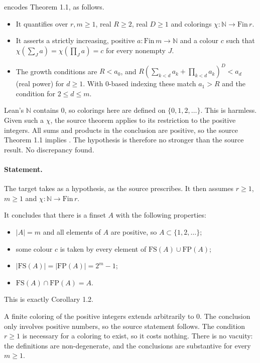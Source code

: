 \documentclass[11pt]{article}
\theoremstyle{definition}
\theoremstyle{remark}
\newcommand{\leanname}[1]{\texttt{\detokenize{#1}}}
\begin{document}
\leanname{HindmanFSFP.Thm11} encodes Theorem 1.1, as follows.
\begin{itemize}
\item It quantifies over $r,m\ge1$, real $R\ge2$, real $D\ge1$ and colorings $\chi:\mathbb N\to\mathrm{Fin}\,r$.
\item It asserts a strictly increasing, positive $a:\mathrm{Fin}\,m\to\mathbb N$ and a colour $c$ such that $\chi(\sum_J a)=\chi(\prod_J a)=c$ for every nonempty $J$.
\item The growth conditions are $R<a_0$, and $R(\sum_{k<d}a_k+\prod_{k<d}a_k)^D<a_d$ (real power) for $d\ge1$. With 0-based indexing these match $a_1>R$ and the condition for $2\le d\le m$.
\end{itemize}

Lean's $\mathbb N$ contains $0$, so colorings here are defined on $\{0,1,2,\ldots\}$. This is harmless. Given such a $\chi$, the source theorem applies to its restriction to the positive integers. All sums and products in the conclusion are positive, so the source Theorem 1.1 implies \leanname{Thm11}. The hypothesis is therefore no stronger than the source result. No discrepancy found.

\paragraph{Statement.} The target takes \leanname{Thm11} as a hypothesis, as the source prescribes. It then assumes $r\ge1$, $m\ge1$ and $\chi:\mathbb N\to\mathrm{Fin}\,r$.

It concludes that there is a finset $A$ with the following properties:
\begin{itemize}
\item $|A|=m$ and all elements of $A$ are positive, so $A\subset\{1,2,\ldots\}$;
\item some colour $c$ is taken by every element of $\mathrm{FS}(A)\cup\mathrm{FP}(A)$;
\item $|\mathrm{FS}(A)|=|\mathrm{FP}(A)|=2^m-1$;
\item $\mathrm{FS}(A)\cap\mathrm{FP}(A)=A$.
\end{itemize}
This is exactly Corollary 1.2.

A finite coloring of the positive integers extends arbitrarily to $0$. The conclusion only involves positive numbers, so the source statement follows. The condition $r\ge1$ is necessary for a coloring to exist, so it costs nothing. There is no vacuity: the definitions are non-degenerate, and the conclusions are substantive for every $m\ge1$.
\end{document}
